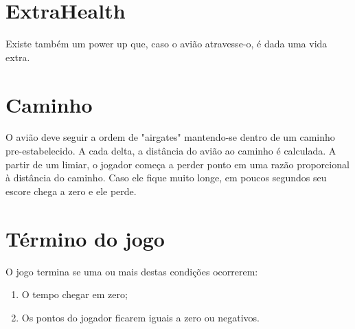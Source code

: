 \section*{ExtraHealth}
Existe também um power up que, caso o avião atravesse-o, é dada uma vida extra.

\section*{Caminho}
O avião deve seguir a ordem de "airgates" mantendo-se dentro de um caminho pre-estabelecido. A cada delta, a distância do avião ao caminho é calculada. A partir de um limiar, o jogador começa a perder ponto em uma razão proporcional à distância do caminho. Caso ele fique muito longe, em poucos segundos seu escore chega a zero e ele perde.

\section*{Término do jogo}
O jogo termina se uma ou mais destas condições ocorrerem:
\begin{enumerate}
    \item O tempo chegar em zero;
    \item Os pontos do jogador ficarem iguais a zero ou negativos.
\end{enumerate}

